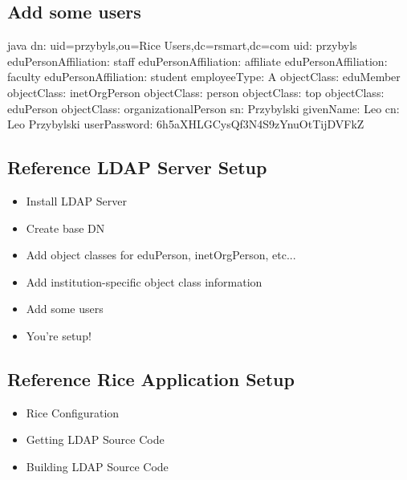 \documentclass[12pt,notitlepage]{article}
\begin{document}
\begin{s5presentation}
\begin{s5slide}
    \W \end{s5slide}

%
%
  \W \begin{s5slide}
    \section{Add some users}
    \begin{code}{java}
dn: uid=przybyls,ou=Rice Users,dc=rsmart,dc=com
uid: przybyls
eduPersonAffiliation: staff
eduPersonAffiliation: affiliate
eduPersonAffiliation: faculty
eduPersonAffiliation: student
employeeType: A
objectClass: eduMember
objectClass: inetOrgPerson
objectClass: person
objectClass: top
objectClass: eduPerson
objectClass: organizationalPerson
sn: Przybylski
givenName: Leo
cn: Leo Przybylski
userPassword: 6h5aXHLGCysQf3N4S9zYnuOtTijDVFkZ
\end{code}
    \W \end{s5slide}

%
%
  \W \begin{s5slide}
    \section{Reference LDAP Server Setup}
    \begin{itemize}
      \item Install LDAP Server
      \item Create base DN
      \item Add object classes for eduPerson, inetOrgPerson, etc...
      \item Add institution-specific object class information
      \item Add some users
      \item You're setup!
    \end{itemize}

    \W \end{s5slide}




%
%
  \W \begin{s5slide}
    \section{Reference Rice Application Setup}
    \begin{itemize}
      \item Rice Configuration
      \item Getting LDAP Source Code
      \item Building LDAP Source Code
    \end{itemize}
    \W \end{s5slide}


\end{s5presentation}
\end{document}
